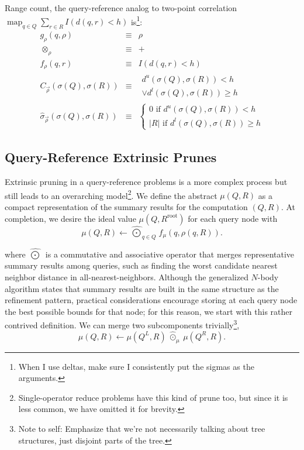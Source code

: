 \documentclass[times, leqno,twocolumn]{article}
\newcommand{\authornote}[1]{\footnote{Note to self: #1}}
\newcommand{\authorsnote}[1]{\authornote{#1}}
\newcommand{\summary}{\hat{\sigma}}
\DeclareMathOperator*{\map}{map}
\newcommand{\kdroot}[1]{#1^{\text{root}}}
\newcommand{\kdleft}[1]{#1^{\!L}}
\newcommand{\kdright}[1]{#1^{\!R}}
\newcommand{\lo}[1]{#1^{l}}
\newcommand{\up}[1]{#1^{u}}
\newcommand{\distlo}{\lo{d}}
\newcommand{\distup}{\up{d}}
\newcommand{\dist}[2]{d(#1,#2)}
\newcommand{\nameOp}[2]{\mathop{#1\nolimits\!\!_{#2}}}
\newcommand{\nameop}[2]{{\scriptstyle\:}#1_{\!#2}}
\newcommand{\myop}[1]{\nameop{\otimes}{#1}}
\newcommand{\letterqr}{\rho}
\newcommand{\inqr}{\rho}
\newcommand{\opqr}{\myop{\letterqr}}
\newcommand{\fqr}{f_{\!\letterqr}}
\newcommand{\gqr}{g_{\!\letterqr}}
\newcommand{\letterqrv}{\vec{\rho}}
\newcommand{\deltaqrv}{\summary_{\!\letterqrv}}
\newcommand{\canpruneqrv}{C_{\!\letterqrv}}
\newcommand{\lettermu}{\mu}
\newcommand{\inmu}{\mu}
\newcommand{\Outopmu}{\widehat{\nameOp{\bigodot}{\lettermu}}}%
\newcommand{\outopmu}{\:\widehat{\odot}_{\!\mu}\:}
\newcommand{\fmu}{f_{\!\lettermu}}
\newcommand{\outstat}{\sigma}
\begin{document}
\noindent Range count, the query-reference analog to two-point correlation $\map_{q \in Q} \sum_{r \in R} I(\dist{q}{r} < h)$ is\footnote{When I use deltas, make sure I consistently put the sigmas as the arguments.}:
\begin{eqnarray*}
\gqr(q, \inqr) &\equiv& \inqr
\\
\opqr &\equiv& +
\\
\fqr(q,r) &\equiv& I(\dist{q}{r} < h)
\\
\canpruneqrv(\sigma(Q), \sigma(R))
&\equiv&
\begin{array}{l}\distup(\outstat(Q),\outstat(R)) < h \\ \vee \distlo(\outstat(Q),\outstat(R)) \geq h\end{array}
\\
\deltaqrv(\outstat(Q),\outstat(R)) &\equiv& \left\{ \begin{array}{l} 0 \text{ if } \distup(\outstat(Q),\outstat(R)) < h \\ |R| \text{ if } \distlo(\outstat(Q),\outstat(R)) \geq h \end{array}\right.
\end{eqnarray*}

\subsection{Query-Reference Extrinsic Prunes}

Extrinsic pruning in a query-reference problems is a more complex process but still leads to an overarching model\footnote{Single-operator reduce problems have this kind of prune too, but since it is less common, we have omitted it for brevity.}.
We define the abstract $\inmu(Q, R)$ as a compact representation of the summary results for the computation $(Q,R)$.
At completion, we desire the ideal value $\inmu(Q, \kdroot{R})$ for each query node with
\begin{equation*}
\inmu(Q, R) \gets \Outopmu_{q \in Q} \fmu(q, \inqr(q, R)).
\end{equation*}

\noindent where $\Outopmu$ is a commutative and associative operator that merges representative summary results among queries, such as finding the worst candidate nearest neighbor distance in all-nearest-neighbors.
Although the generalized $N$-body algorithm states that summary results are built in the same structure as the refinement pattern, practical considerations encourage storing at each query node the best possible bounds for that node; for this reason, we start with this rather contrived definition.
We can merge two subcomponents trivially\authorsnote{Emphasize that we're not necessarily talking about tree structures, just disjoint parts of the tree.},
\begin{equation*}
\inmu(Q, R) \gets \inmu(\kdleft{Q}, R) \outopmu \inmu(\kdright{Q}, R).
\label{eqn:dividemu}
\end{equation*}
\end{document}
